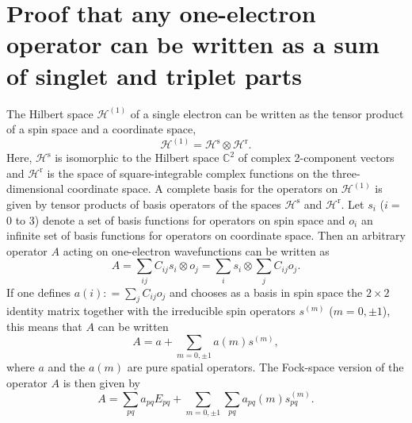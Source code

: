 \section{Proof that any one-electron operator can be written as a sum of singlet and triplet parts}
\label{Ap:proof_one_el_op}
The Hilbert space ${\mathcal{H}^{(1)}}$ of a single electron can be written as the tensor product of a spin space and a coordinate space,
	\begin{equation}
	{\mathcal{H}^{(1)}} = {\mathcal{H}^{\text{s}}} \otimes {\mathcal{H}^{\text{r}}}.
	\end{equation} 	
Here, ${\mathcal{H}^{\text{s}}}$ is isomorphic to the Hilbert space ${\mathbb{C}^2}$ of complex 2-component vectors and ${\mathcal{H}^{\text{r}}}$ is the space of square-integrable complex functions on the three-dimensional coordinate space. A complete basis for the operators on ${\mathcal{H}^{(1)}}$ is given by tensor products of basis operators of the spaces ${\mathcal{H}^{\text{s}}}$ and ${\mathcal{H}^{\text{r}}}$. Let ${s_i}$ ($i =$ 0 to 3) denote a set of basis functions for operators on spin space and ${o_i}$ an infinite set of basis functions for operators on coordinate space. Then an arbitrary operator $A$ acting on one-electron wavefunctions can be written as
	\begin{equation}
	A = \sum\limits_{ij} {{C_{ij}}} {s_i} \otimes {o_j} = \sum\limits_i {{s_i}}  \otimes \sum\limits_j {{C_{ij}}} {o_j}.
	\end{equation} 	
If one defines $a(i): = \sum\limits_j {{C_{ij}}} {o_j}$ and chooses as a basis in spin space the $2 \times 2$ identity matrix together with the irreducible spin operators ${s^{(m)}}$ ($m = 0, \pm 1$), this means that $A$ can be written
	\begin{equation}
	A = a + \sum\limits_{m = 0, \pm 1} a (m){s^{(m)}},
	\end{equation} 	
where $a$ and the $a(m)$ are pure spatial operators. The Fock-space version of the operator $A$ is then given by
	\begin{equation}
	A = \sum\limits_{pq} {{a_{pq}}} {E_{pq}} + \sum\limits_{m = 0, \pm 1} {\sum\limits_{pq} {{a_{pq}}} } (m)s_{pq}^{(m)}.
	\end{equation} 	
